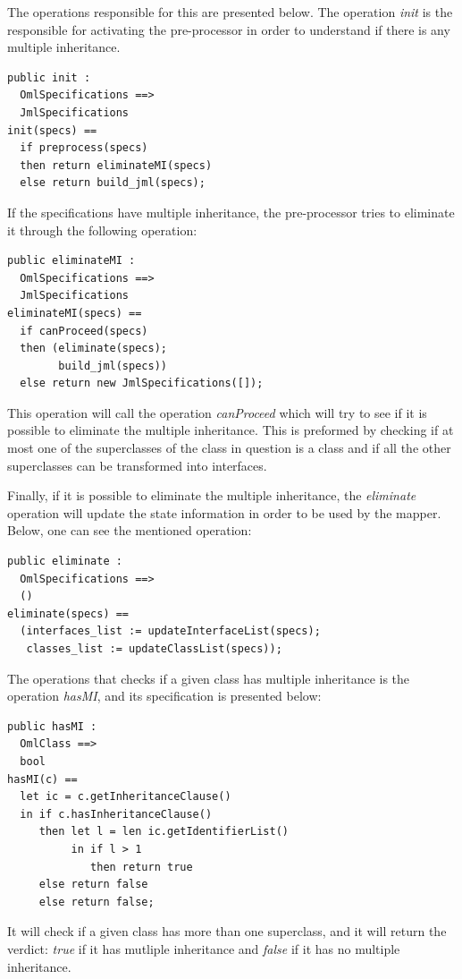 The operations responsible for this are presented below. The operation \textit{init} is the responsible for activating the pre-processor in order to understand if there is any multiple inheritance.
\lstset{style=mystyle}
\bigskip
\begin{lstlisting}
public init :
  OmlSpecifications ==>
  JmlSpecifications
init(specs) ==
  if preprocess(specs) 
  then return eliminateMI(specs)
  else return build_jml(specs);
\end{lstlisting}
\bigskip
If the specifications have multiple inheritance, the pre-processor tries to eliminate it through the following operation:
\bigskip
\begin{lstlisting}
public eliminateMI : 
  OmlSpecifications ==>
  JmlSpecifications
eliminateMI(specs) == 
  if canProceed(specs)
  then (eliminate(specs);
        build_jml(specs))
  else return new JmlSpecifications([]);
\end{lstlisting}
\bigskip
This operation will call the operation \textit{canProceed} which will try to see if it is possible to eliminate the multiple inheritance. This is preformed by checking if at most one of the superclasses of the class in question is a class and if all the other superclasses can be transformed into interfaces.

Finally, if it is possible to eliminate the multiple inheritance, the \textit{eliminate} operation will update the state information in order to be used by the mapper. Below, one can see the mentioned operation:
\bigskip
\begin{lstlisting}
public eliminate :  
  OmlSpecifications ==>
  ()
eliminate(specs) == 
  (interfaces_list := updateInterfaceList(specs);
   classes_list := updateClassList(specs));
\end{lstlisting}
\bigskip

The operations that checks if a given class has multiple inheritance is the operation \textit{hasMI}, and its specification is presented below:
\bigskip
\begin{lstlisting}
public hasMI :
  OmlClass ==>
  bool
hasMI(c) == 
  let ic = c.getInheritanceClause()
  in if c.hasInheritanceClause()
     then let l = len ic.getIdentifierList()
	      in if l > 1 
			 then return true
     else return false
	 else return false;
\end{lstlisting}
\bigskip
It will check if a given class has more than one superclass, and it will return the verdict: \textit{true} if it has mutliple inheritance and \textit{false} if it has no multiple inheritance.

